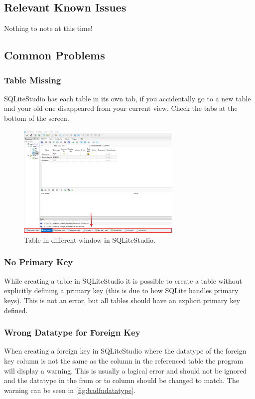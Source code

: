 \documentclass[a4paper,11pt,oneside]{article}
\begin{document}
\begin{sloppypar}
\subsection{Relevant Known Issues}
\label{sqliteStudioKnownIssues}
Nothing to note at this time!

\subsection{Common Problems}
\label{sqliteStudioCommonProblems}

\subsubsection{Table Missing}
\label{sqliteStudioTableDisapered}
SQLiteStudio has each table in its own tab, if you accidentally go to a new table and your old one disappeared from your current view. Check the tabs at the bottom of the screen.
\begin{figure}[!htb]
  \centering
  \includegraphics[width=0.7\textwidth]{sqlitestudio/common_problems/table_disapered.png}
  \caption{Table in different window in SQLiteStudio.}
  \label{fig:tabledisapered}
\end{figure}


\subsubsection{No Primary Key}
\label{sqliteStudioNoPrimaryKey}
While creating a table in SQLiteStudio it is possible to create a table without explicitly defining a primary key (this is due to how SQLite handles primary keys). This is not an error, but all tables should have an explicit primary key defined.


\subsubsection{Wrong Datatype for Foreign Key}
\label{sqliteStudioWrongDatatypeForeignKey}
When creating a foreign key in SQLiteStudio where the datatype of the foreign key column is not the same as the column in the referenced table the program will display a warning. This is usually a logical error and should not be ignored and the datatype in the from or to column should be changed to match. The warning can be seen in \autoref{fig:badfndatatype}.



\end{sloppypar}
\end{document}
